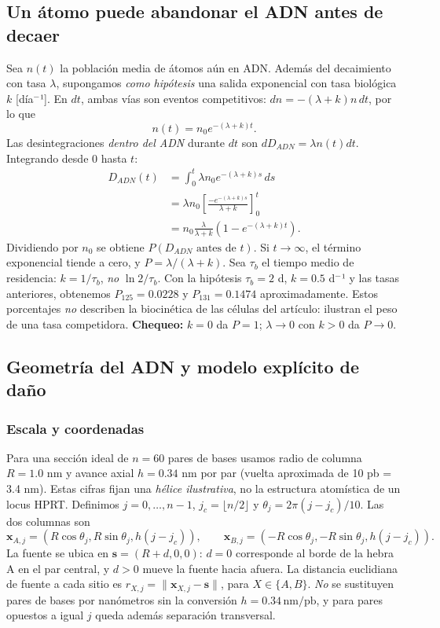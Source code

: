 \documentclass[11pt,a4paper,oneside]{article}
\begin{document}
\subsection{Un átomo puede abandonar el ADN antes de decaer}\label{un-uxe1tomo-puede-abandonar-el-adn-antes-de-decaer}

Sea \(n(t)\) la población media de átomos aún en ADN. Además del decaimiento con tasa \(\lambda\), supongamos \emph{como hipótesis} una salida exponencial con tasa biológica \(k\) {[}día\(^{-}\)¹{]}. En \(dt\), ambas vías son eventos competitivos: \(dn=-(\lambda+k)n\,dt\), por lo que \[n(t)=n_0e^{-(\lambda+k)t}.\] Las desintegraciones \emph{dentro del ADN} durante \(dt\) son \(dD_{ADN}=\lambda n(t)dt\). Integrando desde 0 hasta \(t\): \[\begin{aligned}
D_{ADN}(t)&=\int_0^t\lambda n_0e^{-(\lambda+k)s}\,ds\\
&=\lambda n_0\left[\frac{-e^{-(\lambda+k)s}}{\lambda+k}\right]_0^t\\
&=n_0\frac{\lambda}{\lambda+k}\left(1-e^{-(\lambda+k)t}\right).
\end{aligned}\] Dividiendo por \(n_0\) se obtiene \(P(D_{ADN}\text{ antes de }t)\). Si \(t\to\infty\), el término exponencial tiende a cero, y \(P=\lambda/(\lambda+k)\). Sea \(\tau_b\) el tiempo medio de residencia: \(k=1/\tau_b\), \emph{no} \(\ln2/\tau_b\). Con la hipótesis \(\tau_b=2\) d, \(k=0.5\) d\(^{-}\)¹ y las tasas anteriores, obtenemos \(P_{125}=0.0228\) y \(P_{131}=0.1474\) aproximadamente. Estos porcentajes \emph{no} describen la biocinética de las células del artículo: ilustran el peso de una tasa competidora. \textbf{Chequeo:} \(k=0\) da \(P=1\); \(\lambda\to0\) con \(k>0\) da \(P\to0\).

\subsection{Geometría del ADN y modelo explícito de daño}\label{geometruxeda-del-adn-y-modelo-expluxedcito-de-dauxf1o}

\subsubsection{Escala y coordenadas}\label{escala-y-coordenadas}

Para una sección ideal de \(n=60\) pares de bases usamos radio de columna \(R=1.0\) nm y avance axial \(h=0.34\) nm por par (vuelta aproximada de 10 pb = 3.4 nm). Estas cifras fijan una \emph{hélice ilustrativa}, no la estructura atomística de un locus HPRT. Definimos \(j=0,\ldots,n-1\), \(j_c=\lfloor n/2\rfloor\) y \(\theta_j=2\pi(j-j_c)/10\). Las dos columnas son \[\mathbf x_{A,j}=(R\cos\theta_j,R\sin\theta_j,h(j-j_c)),\qquad
\mathbf x_{B,j}=(-R\cos\theta_j,-R\sin\theta_j,h(j-j_c)).\] La fuente se ubica en \(\mathbf s=(R+d,0,0)\): \(d=0\) corresponde al borde de la hebra A en el par central, y \(d>0\) mueve la fuente hacia afuera. La distancia euclidiana de fuente a cada sitio es \(r_{X,j}=\|\mathbf x_{X,j}-\mathbf s\|\), para \(X\in\{A,B\}\). \emph{No} se sustituyen pares de bases por nanómetros sin la conversión \(h=0.34\,\mathrm{nm}/\mathrm{pb}\), y para pares opuestos a igual \(j\) queda además separación transversal.
\end{document}
